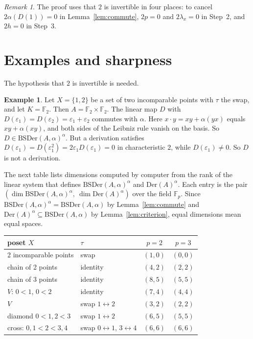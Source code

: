 \documentclass[]{interact}
\theoremstyle{plain}
\theoremstyle{definition}
\newtheorem{example}[theorem]{Example}
\theoremstyle{remark}
\newtheorem{remark}[theorem]{Remark}
\newcommand{\Der}{\mathrm{Der}}
\newcommand{\BSDer}{\mathrm{BSDer}}
\begin{document}
\begin{remark}
The proof uses that $2$ is invertible in four places: to cancel $2\alpha(D(1)) = 0$ in Lemma~\ref{lem:commute}, $2p = 0$ and $2\lambda_x = 0$ in Step~2, and $2h = 0$ in Step~3.
\end{remark}

\section{Examples and sharpness}\label{sec:examples}

The hypothesis that $2$ is invertible is needed. %

\begin{example}\label{ex:antichain}
Let $X = \{1,2\}$ be a set of two incomparable points with $\tau$ the swap, and let $K = \mathbb{F}_2$.
Then $A = \mathbb{F}_2 \times \mathbb{F}_2$.
The linear map $D$ with $D(\varepsilon_1) = D(\varepsilon_2) = \varepsilon_1 + \varepsilon_2$ commutes with $\alpha$.
Here $x \cdot y = xy + \alpha(yx)$ equals $xy + \alpha(xy)$, and both sides of the Leibniz rule vanish on the basis.
So $D \in \BSDer(A,\alpha)^\alpha$.
But a derivation satisfies $D(\varepsilon_1) = D(\varepsilon_1^2) = 2\varepsilon_1D(\varepsilon_1) = 0$ in characteristic $2$, while $D(\varepsilon_1) \ne 0$.
So $D$ is not a derivation.
\end{example}

The next table lists dimensions computed by computer from the rank of the linear system that defines $\BSDer(A,\alpha)^\alpha$ and $\Der(A)^\alpha$. %
Each entry is the pair $(\dim\BSDer(A,\alpha)^\alpha,\ \dim\Der(A)^\alpha)$ over the field $\mathbb{F}_p$. %
Since $\BSDer(A,\alpha)^\alpha = \BSDer(A,\alpha)$ by Lemma~\ref{lem:commute} and $\Der(A)^\alpha \subseteq \BSDer(A,\alpha)$ by Lemma~\ref{lem:criterion}, equal dimensions mean equal spaces.

\begin{center}
\begin{tabular}{l l c c}
poset $X$ & $\tau$ & $p = 2$ & $p = 3$\\
\hline
2 incomparable points & swap & $(1,0)$ & $(0,0)$\\
chain of 2 points & identity & $(4,2)$ & $(2,2)$\\
chain of 3 points & identity & $(8,5)$ & $(5,5)$\\
$V$: $0 < 1$, $0 < 2$ & identity & $(7,4)$ & $(4,4)$\\
$V$ & swap $1 \leftrightarrow 2$ & $(3,2)$ & $(2,2)$\\
diamond $0 < 1,2 < 3$ & swap $1 \leftrightarrow 2$ & $(6,5)$ & $(5,5)$\\
cross: $0,1 < 2 < 3,4$ & swap $0\leftrightarrow 1$, $3 \leftrightarrow 4$ & $(6,6)$ & $(6,6)$
\end{tabular}
\end{center}
\end{document}
